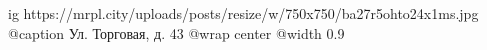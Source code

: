  
 
 
 
 

\ifcmt
  ig https://mrpl.city/uploads/posts/resize/w/750x750/ba27r5ohto24x1ms.jpg
	@caption Ул. Торговая, д. 43
  @wrap center
  @width 0.9
\fi
